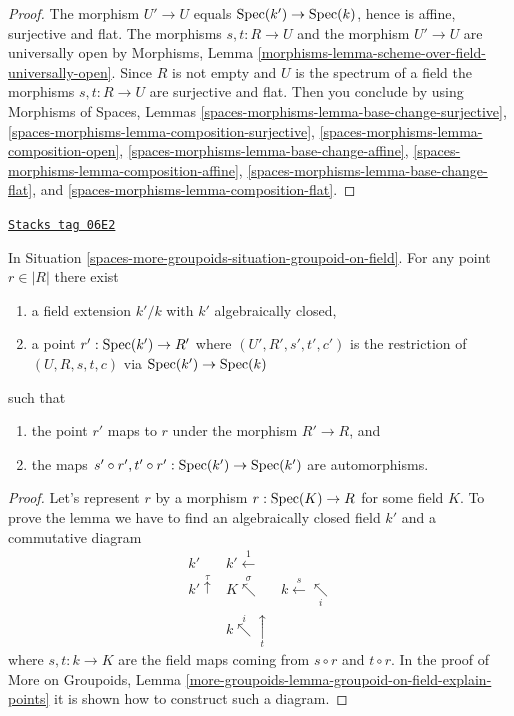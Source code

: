 \begin{proof}
The morphism $U' \to U$ equals $\operatorname{Spec}(k') \to \operatorname{Spec}(k)$,
hence is affine, surjective and flat. The morphisms $s, t : R \to U$
and the morphism $U' \to U$ are universally open by
Morphisms, Lemma \ref{morphisms-lemma-scheme-over-field-universally-open}.
Since $R$ is not empty and $U$ is the spectrum of a field the morphisms
$s, t : R \to U$ are surjective and flat. Then you conclude by using
Morphisms of Spaces, Lemmas
\ref{spaces-morphisms-lemma-base-change-surjective},
\ref{spaces-morphisms-lemma-composition-surjective},
\ref{spaces-morphisms-lemma-composition-open},
\ref{spaces-morphisms-lemma-base-change-affine},
\ref{spaces-morphisms-lemma-composition-affine},
\ref{spaces-morphisms-lemma-base-change-flat}, and
\ref{spaces-morphisms-lemma-composition-flat}.
\end{proof}

\begin{lemma}
\label{spaces-more-groupoids-lemma-groupoid-on-field-explain-points}
\href{https://stacks.math.columbia.edu/tag/06E2}{\texttt{Stacks tag 06E2}}

In
Situation \ref{spaces-more-groupoids-situation-groupoid-on-field}.
For any point $r \in |R|$ there exist
\begin{enumerate}
\item a field extension $k'/k$ with $k'$ algebraically closed,
\item a point $r' : \operatorname{Spec}(k') \to R'$ where
$(U', R', s', t', c')$ is the restriction of $(U, R, s, t, c)$
via $\operatorname{Spec}(k') \to \operatorname{Spec}(k)$
\end{enumerate}
such that
\begin{enumerate}
\item the point $r'$ maps to $r$ under the morphism $R' \to R$, and
\item the maps
$s' \circ r', t' \circ r' : \operatorname{Spec}(k') \to \operatorname{Spec}(k')$
are automorphisms.
\end{enumerate}
\end{lemma}

\begin{proof}
Let's represent $r$ by a morphism $r : \operatorname{Spec}(K) \to R$ for some
field $K$. To prove the lemma we have to find an algebraically closed
field $k'$ and a commutative diagram
$$
\begin{array}{ccc}k' & k' \overset{1}{\longleftarrow} &  \\ k' \overset{\tau}{\uparrow} & K \overset{\sigma}{\nwarrow} & k \overset{s}{\longleftarrow}\underset{i}{\nwarrow} \\  & k \overset{i}{\nwarrow}\underset{t}{\uparrow} & \end{array}
$$
where $s, t : k \to K$ are the field maps coming from
$s \circ r$ and $t \circ r$. In the proof of
More on Groupoids,
Lemma \ref{more-groupoids-lemma-groupoid-on-field-explain-points}
it is shown how to construct such a diagram.
\end{proof}

